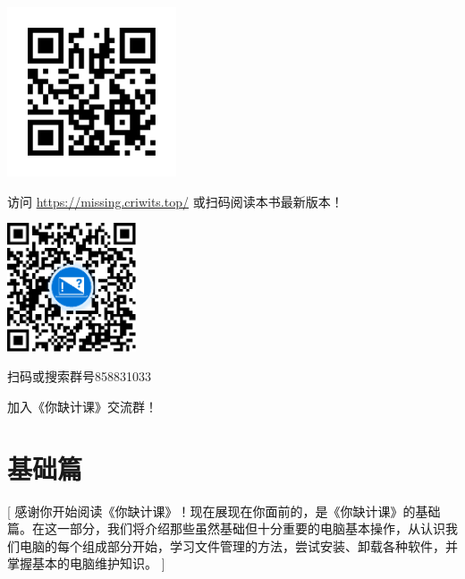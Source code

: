 \documentclass[a4paper]{book}
\begin{document}
\begin{center}
  \vspace*{1cm}
  \begin{minipage}{.4\textwidth}
    \centering
    \includegraphics[width=5cm]{assets/QR_CODE.png}\par
    访问 \url{https://missing.criwits.top/} 或扫码阅读本书最新版本！\par
  \end{minipage}
  \qquad
  \begin{minipage}{.4\textwidth}
    \centering
    \vskip0.6cm
    \includegraphics[width=3.8cm]{assets/QQ_group.pdf}\par
    \vskip0.6cm
    扫码或搜索群号858831033\par
    加入《你缺计课》交流群！\par
  \end{minipage}
\end{center}  



\tableofcontents

\mainmatter

\part{基础篇}[
  感谢你开始阅读《你缺计课》！现在展现在你面前的，是《你缺计课》的基础篇。在这一部分，我们将介绍那些虽然基础但十分重要的电脑基本操作，从认识我们电脑的每个组成部分开始，学习文件管理的方法，尝试安装、卸载各种软件，并掌握基本的电脑维护知识。
]
\end{document}
